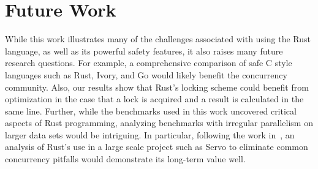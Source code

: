 \section{Future Work}\label{sec::futurework}

While this work illustrates many of the challenges associated with using the Rust language, as well as its powerful safety features, it also raises many future research questions. For example, a comprehensive comparison of safe C style languages such as Rust, Ivory, and Go would likely benefit the concurrency community. Also, our results show that Rust's locking scheme could benefit from optimization in the case that a lock is acquired and a result is calculated in the same line. Further, while the benchmarks used in this work uncovered critical aspects of Rust programming, analyzing benchmarks with irregular parallelism on larger data sets would be intriguing. In particular, following the work in~\cite{learning}, an analysis of Rust’s use in a large scale project such as Servo to eliminate common concurrency pitfalls would demonstrate its long-term value well.
